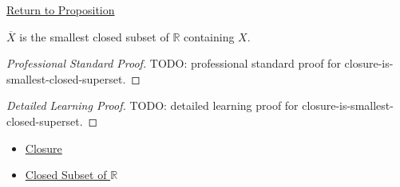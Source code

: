 \newpage
{}
\label{prf:closure-is-smallest-closed-superset}

\begin{remark*}[Return]
\hyperref[prop:closure-is-smallest-closed-superset]{Return to Proposition}
\end{remark*}

\begin{proposition*}
\(\overline{X}\) is the smallest closed subset of \(\mathbb{R}\) containing \(X\).
\end{proposition*}

\begin{proof}[Professional Standard Proof]
\LRAProofBodyStart
TODO: professional standard proof for closure-is-smallest-closed-superset.
\end{proof}

\begin{proof}[Detailed Learning Proof]
\LRAProofBodyStart
TODO: detailed learning proof for closure-is-smallest-closed-superset.
\end{proof}

\begin{remark*}
\end{remark*}

\begin{dependencies}
\begin{itemize}
  \item \hyperref[def:closure-r]{Closure}
  \item \hyperref[def:closed-set-r]{Closed Subset of \(\mathbb{R}\)}
\end{itemize}
\end{dependencies}

\clearpage
